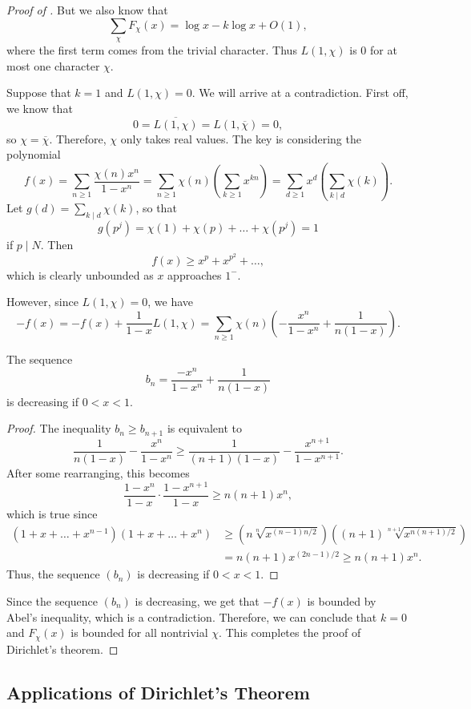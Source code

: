 \documentclass{scrartcl}
\begin{document}
\begin{proof}[Proof of ]
	But we also know that $$\sum_\chi F_\chi(x) = \log x-k\log x+O(1),$$
	where the first term comes from the trivial character. Thus $L(1, \chi)$ is 
	$0$ for at most one character $\chi$. 
	
	Suppose that $k=1$ and $L(1, \chi)=0$. We will arrive at a contradiction. 
	First off, we know that 
	$$0=\overline{L(1, \chi)} = L(1, \overline{\chi})=0,$$ 
	so $\chi = \overline{\chi}$. Therefore, $\chi$ only takes real values. 
	The key is considering the polynomial 
	$$f(x) = \sum_{n\ge 1}\frac{\chi(n)x^n}{1-x^n} = \sum_{n\ge 1}\chi(n)\left(\sum_{k\ge 1}x^{kn}\right)
	=\sum_{d\ge 1}x^d\left(\sum_{k\mid d}\chi(k)\right).$$
	Let $g(d) = \sum_{k\mid d}\chi(k)$, so that 
	$$g(p^j) = \chi(1)+\chi(p)+\dots+\chi(p^j)=1$$
	if $p\mid N$. Then 
	$$f(x)\ge x^p+x^{p^2}+\dots,$$
	which is clearly unbounded as $x$ approaches $1^-$.
	
	However, since $L(1, \chi)=0$, we have 
	$$-f(x)=-f(x)+\frac{1}{1-x}L(1, \chi) = \sum_{n\ge 1}\chi(n) \left(-\frac{x^n}{1-x^n}+\frac{1}{n(1-x)}\right).$$
	
	\begin{claim}
		The sequence $$b_n=\frac{-x^n}{1-x^n}+\frac{1}{n(1-x)}$$ 
		is decreasing if $0<x<1$. 
	\end{claim}
	
	\begin{proof}
		The inequality $b_n\ge b_{n+1}$ is equivalent to 
		$$\frac{1}{n(1-x)}-\frac{x^n}{1-x^n} \ge \frac{1}{(n+1)(1-x)}-\frac{x^{n+1}}{1-x^{n+1}}.$$
		After some rearranging, this becomes 
		$$\frac{1-x^n}{1-x}\cdot \frac{1-x^{n+1}}{1-x}\ge n(n+1)x^n,$$
		which is true since 
		\begin{align*}
			(1+x+\dots+x^{n-1})(1+x+\dots+x^n)&
			\ge \left(n\sqrt[n]{x^{(n-1)n/2}}\right)\left((n+1)\sqrt[n+1]{x^{n(n+1)/2}}\right) \\
			&= n(n+1)x^{(2n-1)/2} \ge n(n+1)x^n.
		\end{align*}
		Thus, the sequence $(b_n)$ is decreasing if $0<x<1$. 
	\end{proof}
	Since the sequence $(b_n)$ is decreasing, we get that $-f(x)$ is bounded by Abel's inequality, 
	which is a contradiction. 
	Therefore, we can conclude that $k=0$ and $F_\chi(x)$ is bounded for all nontrivial $\chi$. 
	This completes the proof of Dirichlet's theorem.
\end{proof}

\subsection{Applications of Dirichlet's Theorem}
\end{document}
